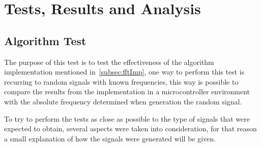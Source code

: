 \cleardoublepage
\chapter{Tests, Results and Analysis}\label{chap:Tests}
\section{Algorithm Test}
The purpose of this test is to test the effectiveness of the algorithm implementation mentioned in~\ref{subsec:fftImp}, one way to perform this test is recurring to random signals with known frequencies, this way is possible to compare the results from the implementation in a microcontroller environment with the absolute frequency determined when generation the random signal.

To try to perform the tests as close as possible to the type of signals that were expected to obtain, several aspects were taken into consideration, for that reason a small explanation of how the signals were generated will be given. 
